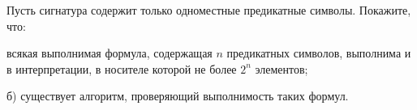 Пусть сигнатура содержит только одноместные предикатные символы. Покажите, что:
\begin{enumcyr}
    \item всякая выполнимая формула, содержащая $n$ предикатных символов, выполнима и в интерпретации, в носителе которой не
    	более $2^n$ элементов;
    \item [б)] существует алгоритм, проверяющий выполнимость таких формул.
\end{enumcyr}